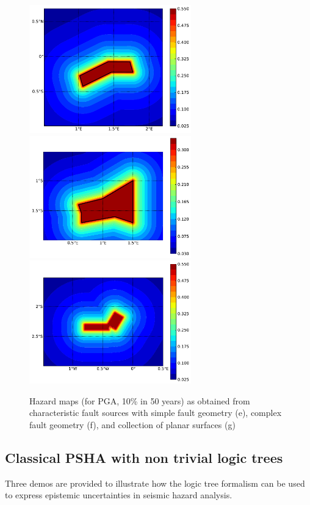 \begin{figure} 
\centering 
\subcaptionbox{}
{\includegraphics[width=7cm]{figures/hazard/char_fault2.pdf}} 
\subcaptionbox{}
{\includegraphics[width=7cm]{figures/hazard/char_fault3.pdf}} 
\subcaptionbox{}
{\includegraphics[width=7cm]{figures/hazard/char_fault1.pdf}} 
\caption{Hazard maps (for PGA, 10\% in 50 years) as obtained from 
    characteristic fault sources with simple fault
    geometry (e), complex fault geometry (f), and collection of 
    planar surfaces (g)}
\label{fig:hazard_maps2}
\end{figure}

\clearpage
\subsection{Classical PSHA with non trivial logic trees}

Three demos are provided to illustrate how the logic tree formalism can be
used to express epistemic uncertainties in seismic hazard analysis.

